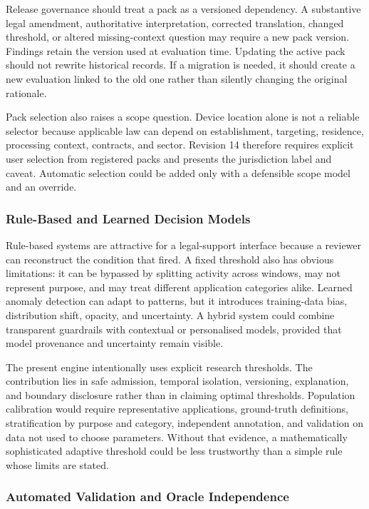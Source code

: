 Release governance should treat a pack as a versioned dependency. A substantive legal amendment, authoritative interpretation, corrected translation, changed threshold, or altered missing-context question may require a new pack version. Findings retain the version used at evaluation time. Updating the active pack should not rewrite historical records. If a migration is needed, it should create a new evaluation linked to the old one rather than silently changing the original rationale.

Pack selection also raises a scope question. Device location alone is not a reliable selector because applicable law can depend on establishment, targeting, residence, processing context, contracts, and sector. Revision 14 therefore requires explicit user selection from registered packs and presents the jurisdiction label and caveat. Automatic selection could be added only with a defensible scope model and an override.

\subsubsection{Rule-Based and Learned Decision Models}

Rule-based systems are attractive for a legal-support interface because a reviewer can reconstruct the condition that fired. A fixed threshold also has obvious limitations: it can be bypassed by splitting activity across windows, may not represent purpose, and may treat different application categories alike. Learned anomaly detection can adapt to patterns, but it introduces training-data bias, distribution shift, opacity, and uncertainty. A hybrid system could combine transparent guardrails with contextual or personalised models, provided that model provenance and uncertainty remain visible.

The present engine intentionally uses explicit research thresholds. The contribution lies in safe admission, temporal isolation, versioning, explanation, and boundary disclosure rather than in claiming optimal thresholds. Population calibration would require representative applications, ground-truth definitions, stratification by purpose and category, independent annotation, and validation on data not used to choose parameters. Without that evidence, a mathematically sophisticated adaptive threshold could be less trustworthy than a simple rule whose limits are stated.

\subsubsection{Automated Validation and Oracle Independence}


